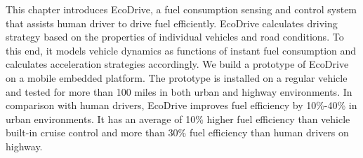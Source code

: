 This chapter introduces EcoDrive, a fuel consumption sensing and control
system that assists human driver to drive fuel efficiently. 
EcoDrive calculates driving strategy based on the properties of individual vehicles 
and road conditions. 
To this end, it models vehicle dynamics as functions of instant fuel consumption
and calculates acceleration strategies accordingly. 
We build a prototype of EcoDrive on a mobile embedded platform. 
The prototype is installed on a regular vehicle and
tested for more than 100 miles in both urban and highway environments. 
In comparison with human drivers, 
EcoDrive improves fuel efficiency by 10\%-40\% in urban environments. 
It has an average of 10\% higher fuel efficiency than vehicle built-in cruise control
and more than 30\% fuel efficiency than human drivers
on highway.  


